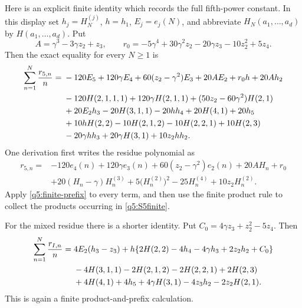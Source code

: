 Here is an explicit finite identity which records the full fifth-power
constant.  In this display set $h_j=H_N^{(j)}$, $h=h_1$,
$E_j=e_j(N)$, and abbreviate $H_N(a_1,\ldots,a_d)$ by
$H(a_1,\ldots,a_d)$.  Put
\[
 A=\gamma^3-3\gamma z_2+z_3,\qquad
 r_0=-5\gamma^4+30\gamma^2z_2-20\gamma z_3-10z_2^2+5z_4.
\]
Then the exact equality for every $N\geq1$ is
\begin{align}\label{q5:S5finite}
 \sum_{n=1}^N\frac{r_{5,n}}n={}&
  -120E_5+120\gamma E_4+60(z_2-\gamma^2)E_3
       +20AE_2+r_0h+20Ah_2\notag\\
 &-120H(2,1,1,1)+120\gamma H(2,1,1)
       +(50z_2-60\gamma^2)H(2,1)\notag\\
 &+20E_2h_3-20H(3,1,1)-20hh_4
       +20H(4,1)+20h_5\notag\\
 &+10hH(2,2)-10H(2,1,2)-10H(2,2,1)+10H(2,3)\notag\\
 &-20\gamma hh_3+20\gamma H(3,1)+10z_2hh_2.
\end{align}
One derivation first writes the residue polynomial as
\begin{align*}
 r_{5,n}={}&-120e_4(n)+120\gamma e_3(n)
       +60(z_2-\gamma^2)e_2(n)+20A H_n+r_0\\
 &+20(H_n-\gamma)H_n^{(3)}
       +5\bigl(H_n^{(2)}\bigr)^2-25H_n^{(4)}+10z_2H_n^{(2)}.
\end{align*}
Apply \eqref{q5:finite-prefix} to every term, and then use the finite
product rule to collect the products occurring in \eqref{q5:S5finite}.

For the mixed residue there is a shorter identity.  Put
$C_0=4\gamma z_3+z_2^2-5z_4$.  Then
\begin{align}\label{q5:SIfinite}
 \sum_{n=1}^N\frac{r_{I,n}}n={}&
 4E_2(h_3-z_3)
 +h\{2H(2,2)-4h_4-4\gamma h_3+2z_2h_2+C_0\}\notag\\
 &-4H(3,1,1)-2H(2,1,2)-2H(2,2,1)+2H(2,3)\notag\\
 &+4H(4,1)+4h_5+4\gamma H(3,1)-4z_3h_2-2z_2H(2,1).
\end{align}
This is again a finite product-and-prefix calculation.

